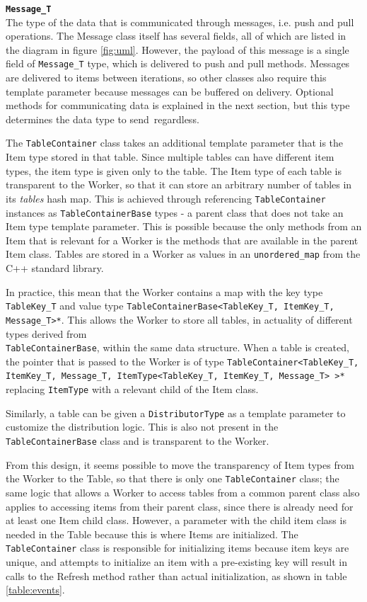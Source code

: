 \documentclass{uit-report}
\begin{document}
\hspace{4ex} \textbf{\texttt{Message\_T}}
\\
The type of the data that is communicated through messages, i.e. push and pull operations. The Message class itself has several fields, all of which are listed in the diagram in figure \ref{fig:uml}. However, the payload of this message is a single field of \texttt{Message\_T} type, which is delivered to push and pull methods. Messages are delivered to items between iterations, so other classes also require this template parameter because messages can be buffered on delivery. Optional methods for communicating data is explained in the next section, but this type determines the data type to send~regardless.
  
The \texttt{TableContainer} class takes an additional template parameter that is the Item type stored in that table. Since multiple tables can have different item types, the item type is given only to the table. The Item type of each table is transparent to the Worker, so that it can store an arbitrary number of tables in its \emph{tables} hash map. This is achieved through referencing \texttt{TableContainer} instances as \texttt{TableContainerBase} types - a parent class that does not take an Item type template parameter. This is possible because the only methods from an Item that is relevant for a Worker is the methods that are available in the parent Item class. Tables are stored in a Worker as values in an \texttt{unordered\_map} from the C++ standard library.

In practice, this mean that the Worker contains a map with the key type 
\texttt{TableKey\_T} and value type \texttt{TableContainerBase<TableKey\_T, ItemKey\_T, Message\_T>*}. This allows the Worker to store all tables, in actuality of different types derived from\\ \texttt{TableContainerBase}, within the same data structure. When a table is created, the pointer that is passed to the Worker is of type \texttt{TableContainer<TableKey\_T, ItemKey\_T, Message\_T, ItemType<TableKey\_T, ItemKey\_T, Message\_T> >*}\\ replacing \texttt{ItemType} with a relevant child of the Item class.

Similarly, a table can be given a \texttt{DistributorType} as a template parameter to customize the distribution logic. This is also not present in the \texttt{TableContainerBase} class and is transparent to the Worker.

From this design, it seems possible to move the transparency of Item types from the Worker to the Table, so that there is only one \texttt{TableContainer} class; the same logic that allows a Worker to access tables from a common parent class also applies to accessing items from their parent class, since there is already need for at least one Item child class. However, a parameter with the child item class is needed in the Table because this is where Items are initialized. The \texttt{TableContainer} class is responsible for initializing items because item keys are unique, and attempts to initialize an item with a pre-existing key will result in calls to the Refresh method rather than actual initialization, as shown in table \ref{table:events}.
\end{document}
